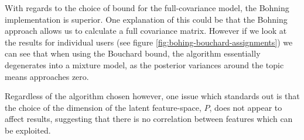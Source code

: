With regards to the choice of bound for the full-covariance model, the Bohning implementation is superior. One explanation of this could be that the Bohning approach allows us to calculate a full covariance matrix. However if we look at the results for individual users (see figure \ref{fig:bohing-bouchard-assignments}) we can see that when using the Bouchard bound, the algorithm essentially degenerates into a mixture model, as the posterior variances around the topic means approaches zero. 



Regardless of the algorithm chosen however, one issue which standards out is that the choice of the dimension of the latent feature-space, $P$, does not appear to affect results, suggesting that there is no correlation between features which can be exploited.



